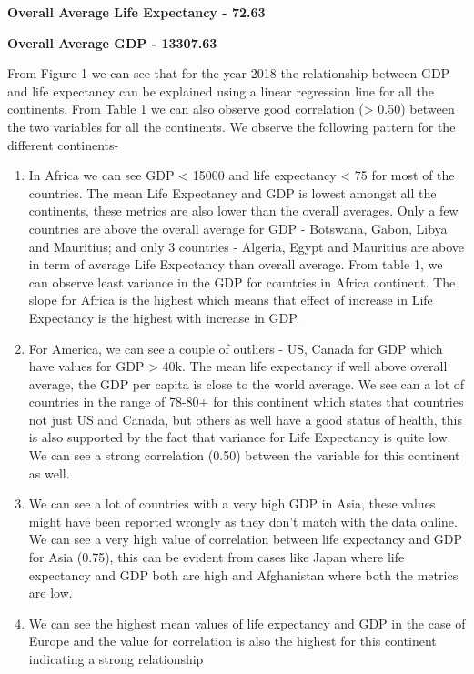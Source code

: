 \documentclass[]{article}
\begin{document}
\textbf{Overall Average Life Expectancy - 72.63}

\textbf{Overall Average GDP - 13307.63}

From Figure 1 we can see that for the year 2018 the relationship between
GDP and life expectancy can be explained using a linear regression line
for all the continents. From Table 1 we can also observe good
correlation (\textgreater{} 0.50) between the two variables for all the
continents. We observe the following pattern for the different
continents-

\begin{enumerate}
\def\labelenumi{\arabic{enumi}.}
\item
  In Africa we can see GDP \textless{} 15000 and life expectancy
  \textless{} 75 for most of the countries. The mean Life Expectancy and
  GDP is lowest amongst all the continents, these metrics are also lower
  than the overall averages. Only a few countries are above the overall
  average for GDP - Botswana, Gabon, Libya and Mauritius; and only 3
  countries - Algeria, Egypt and Mauritius are above in term of average
  Life Expectancy than overall average. From table 1, we can observe
  least variance in the GDP for countries in Africa continent. The slope
  for Africa is the highest which means that effect of increase in Life
  Expectancy is the highest with increase in GDP. 
\item
  For America, we can see a couple of outliers - US, Canada for GDP
  which have values for GDP \textgreater{} 40k. The mean life expectancy
  if well above overall average, the GDP per capita is close to the
  world average. We see can a lot of countries in the range of 78-80+
  for this continent which states that countries not just US and Canada,
  but others as well have a good status of health, this is also
  supported by the fact that variance for Life Expectancy is quite low.
  We can see a strong correlation (0.50) between the variable for this
  continent as well. 
\item
  We can see a lot of countries with a very high GDP in Asia, these
  values might have been reported wrongly as they don't match with the
  data online. We can see a very high value of correlation between life
  expectancy and GDP for Asia (0.75), this can be evident from cases
  like Japan where life expectancy and GDP both are high and Afghanistan
  where both the metrics are low. 
\item
  We can see the highest mean values of life expectancy and GDP in the
  case of Europe and the value for correlation is also the highest for
  this continent indicating a strong relationship 
\end{enumerate}
\end{document}
